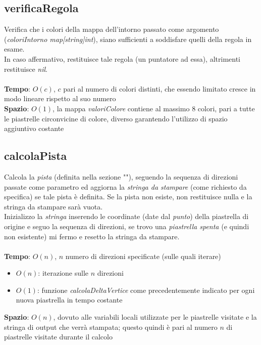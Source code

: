 \documentclass{article}
\begin{document}
\subsection{verificaRegola}\label{subsec:checkRule}
Verifica che i colori della mappa dell'intorno passato come argomento (\textit{coloriIntorno map[string]int}), siano sufficienti a soddisfare quelli della regola in esame.\\
In caso affermativo, restituisce tale regola (un puntatore ad essa), altrimenti restituisce \textit{nil}.
\\ \\
\textbf{Tempo}: \(O(c)\), \(c\) pari al numero di colori distinti, che essendo limitato cresce in modo lineare rispetto al suo numero\\
\textbf{Spazio}: \(O(1)\), la mappa \textit{valoriColore} contiene al massimo 8 colori, pari a tutte le piastrelle circonvicine di colore, diverso garantendo l'utilizzo di spazio aggiuntivo costante

\subsection{calcolaPista}\label{subsec:getPista}
Calcola la \textit{pista} (definita nella sezione ""), seguendo la sequenza di direzioni passate come parametro ed aggiorna la \textit{stringa da stampare} (come richiesto da specifica) se tale pista è definita. Se la pista non esiste, non restituisce nulla e la stringa da stampare sarà vuota.\\
Inizializzo la \textit{stringa} inserendo le coordinate (date dal \textit{punto}) della piastrella di origine e seguo la sequenza di direzioni, se trovo una \textit{piastrella spenta} (e quindi non esistente) mi fermo e resetto la stringa da stampare.\\ \\
\textbf{Tempo}: \(O(n)\), \(n\) numero di direzioni specificate (sulle quali iterare)\\
\begin{itemize}
  \item \(O(n)\): iterazione sulle \(n\) direzioni
  \item \(O(1)\): funzione \textit{calcolaDeltaVertice} come precedentemente indicato per ogni nuova piastrella in tempo costante
\end{itemize}
\textbf{Spazio}: \(O(n)\), dovuto alle variabili locali utilizzate per le piastrelle visitate e la stringa di output che verrà stampata; questo quindi è pari al numero \(n\) di piastrelle visitate durante il calcolo
\end{document}

